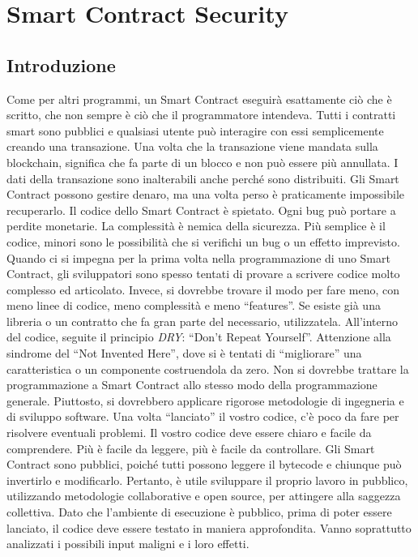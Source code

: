 \chapter{Smart Contract Security}

\section{Introduzione}

Come per altri programmi, un Smart Contract eseguirà esattamente ciò che è scritto,
che non sempre è ciò che il programmatore intendeva. Tutti i contratti smart sono
pubblici e qualsiasi utente può interagire con essi semplicemente creando una
transazione.
Una volta che la transazione viene mandata sulla blockchain, significa che fa parte
di un blocco e non può essere più annullata.
I dati della transazione sono inalterabili anche perché
sono distribuiti.
Gli Smart Contract possono gestire denaro, ma una volta perso è praticamente
impossibile recuperarlo.
Il codice dello Smart Contract è spietato. Ogni bug può portare a perdite
monetarie.
La complessità è nemica della sicurezza. Più semplice è il codice,
minori sono le possibilità
che si verifichi un bug o un effetto imprevisto. Quando ci si impegna per la
prima volta nella
programmazione di uno Smart Contract, gli sviluppatori sono spesso tentati di
provare a scrivere codice molto complesso ed articolato.
Invece, si dovrebbe trovare il modo per fare meno, con meno linee di
codice, meno complessità e meno ``features''.
Se esiste già una libreria o un contratto che fa gran parte del necessario, utilizzatela.
All'interno del codice, seguite il principio \textit{DRY}: ``Don't Repeat Yourself''.
Attenzione alla sindrome del ``Not Invented Here'', dove si è tentati di
``migliorare'' una caratteristica o un componente costruendola da zero.
Non si dovrebbe trattare la programmazione a Smart Contract allo stesso modo della
programmazione generale. Piuttosto, si dovrebbero applicare rigorose metodologie di
ingegneria e di sviluppo software.
Una volta ``lanciato'' il vostro codice, c'è poco da fare per risolvere eventuali
problemi.
Il vostro codice deve essere chiaro e facile da comprendere.
Più è facile da leggere, più è
facile da controllare.
Gli Smart Contract sono pubblici, poiché tutti possono leggere il bytecode
e chiunque può
invertirlo e modificarlo. Pertanto, è utile sviluppare il proprio lavoro in
pubblico, utilizzando
metodologie collaborative e open source, per attingere alla saggezza collettiva.
Dato che l'ambiente di esecuzione è pubblico, prima di poter essere lanciato,
il codice deve essere
testato in maniera approfondita.
Vanno soprattutto analizzati i possibili input maligni e i loro effetti.

